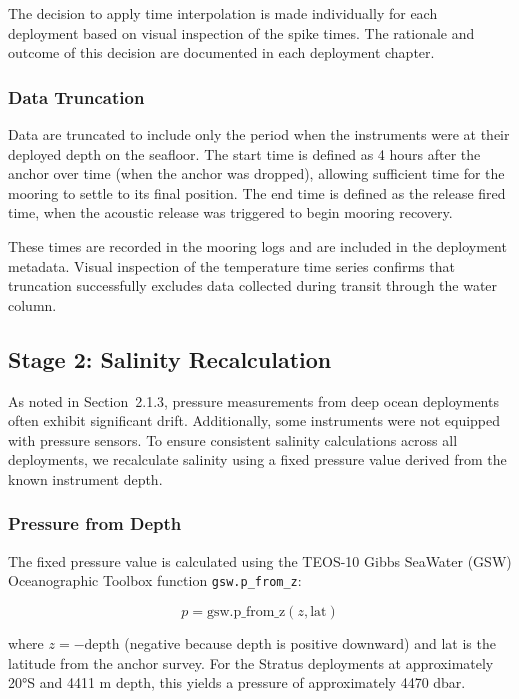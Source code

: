The decision to apply time interpolation is made individually for each deployment based on visual inspection of the spike times. The rationale and outcome of this decision are documented in each deployment chapter.

\subsubsection{Data Truncation}

Data are truncated to include only the period when the instruments were at their deployed depth on the seafloor. The start time is defined as 4 hours after the anchor over time (when the anchor was dropped), allowing sufficient time for the mooring to settle to its final position. The end time is defined as the release fired time, when the acoustic release was triggered to begin mooring recovery.

These times are recorded in the mooring logs and are included in the deployment metadata. Visual inspection of the temperature time series confirms that truncation successfully excludes data collected during transit through the water column.

\subsection{Stage 2: Salinity Recalculation}
\label{sec:salinity_calc}

As noted in Section~2.1.3, pressure measurements from deep ocean deployments often exhibit significant drift. Additionally, some instruments were not equipped with pressure sensors. To ensure consistent salinity calculations across all deployments, we recalculate salinity using a fixed pressure value derived from the known instrument depth.

\subsubsection{Pressure from Depth}

The fixed pressure value is calculated using the TEOS-10 Gibbs SeaWater (GSW) Oceanographic Toolbox function \texttt{gsw.p\_from\_z}:

\begin{equation}
p = \text{gsw.p\_from\_z}(z, \text{lat})
\end{equation}

where $z = -\text{depth}$ (negative because depth is positive downward) and lat is the latitude from the anchor survey. For the Stratus deployments at approximately 20°S and 4411 m depth, this yields a pressure of approximately 4470 dbar.

